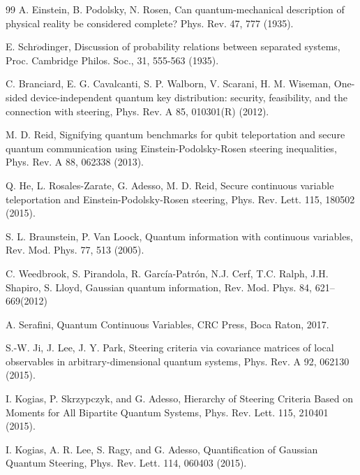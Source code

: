 \documentclass[10pt,aps,pra,amsfonts,amssymb,amsmath,%
floatfix,nofootinbib, groupedaddress,superscriptaddress,citesort,twocolumn
]{revtex4}%
\begin{document}
\begin{thebibliography}{99}
 A. Einstein, B. Podolsky, N. Rosen,
\newblock Can quantum-mechanical description of physical reality be considered complete?
\newblock Phys. Rev.  47, 777 (1935).

 E. Schr$\ddot{o}$dinger,
\newblock Discussion of probability relations between separated systems,
\newblock Proc. Cambridge Philos. Soc., 31, 555-563 (1935).

 C. Branciard, E. G. Cavalcanti, S. P. Walborn, V. Scarani, H. M. Wiseman,
\newblock One-sided device-independent quantum key distribution: security, feasibility, and the connection with steering,
\newblock Phys. Rev. A  85, 010301(R) (2012).

 M. D. Reid,
\newblock Signifying quantum benchmarks for qubit teleportation and secure quantum communication using Einstein-Podolsky-Rosen steering inequalities,
\newblock Phys. Rev. A  88, 062338 (2013).

 Q. He, L. Rosales-Zarate, G. Adesso, M. D. Reid,
\newblock Secure continuous variable teleportation and Einstein-Podolsky-Rosen steering,
\newblock Phys. Rev. Lett.  115, 180502 (2015).



 S. L. Braunstein, P. Van Loock,
\newblock Quantum information with continuous variables,
\newblock Rev. Mod. Phys.  77, 513 (2005).

C. Weedbrook, S. Pirandola, R. García-Patrón, N.J. Cerf, T.C. Ralph, J.H.
Shapiro, S. Lloyd,
\newblock Gaussian quantum information,
\newblock Rev. Mod. Phys. 84, 621–669(2012)

A. Serafini,
\newblock Quantum Continuous Variables, CRC Press, Boca Raton, 2017.



 S.-W. Ji, J. Lee, J. Y. Park,
\newblock Steering criteria via covariance matrices of local observables in arbitrary-dimensional quantum systems,
\newblock Phys. Rev. A 92, 062130 (2015).

 I. Kogias, P. Skrzypczyk, and G. Adesso,
\newblock Hierarchy of Steering Criteria Based on Moments for All Bipartite Quantum Systems,
\newblock Phys. Rev. Lett. 115, 210401 (2015).

 I. Kogias, A. R. Lee, S. Ragy, and G. Adesso,
\newblock Quantification of Gaussian Quantum Steering,
\newblock    Phys. Rev. Lett. 114, 060403 (2015).


\end{thebibliography}
\end{document}
